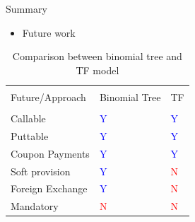 \documentclass{beamer}
\begin{document}
\begin{frame}{Summary}
	\begin{itemize}
		\item Future work
	\end{itemize}
	\begin{table}
		\centering
		\begin{tabular}{lll}
		\hline\hline\\
		Future/Approach  & Binomial Tree & TF\\
		\hline\\
		Callable		 & \textcolor{blue}{Y} & \textcolor{blue}{Y}\\
		Puttable		 & \textcolor{blue}{Y} & \textcolor{blue}{Y}\\
		Coupon Payments  & \textcolor{blue}{Y} & \textcolor{blue}{Y}\\
		Soft provision   & \textcolor{blue}{Y} & \textcolor{red}{N}\\
		Foreign Exchange & \textcolor{blue}{Y} & \textcolor{red}{N}\\
		Mandatory		 & \textcolor{red}{N} & \textcolor{red}{N}\\
		\hline
		\end{tabular}
		\caption{Comparison between binomial tree and TF model}
		\label{tb:future_work}
	\end{table}
\end{frame}
\end{document}

